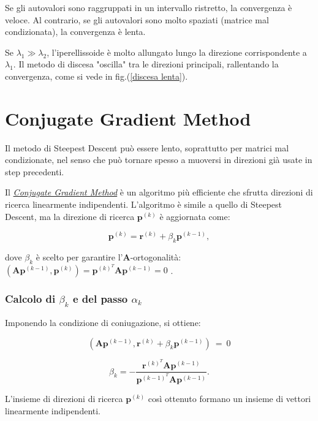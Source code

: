Se gli autovalori sono raggruppati in un intervallo ristretto, la convergenza è veloce. Al contrario, se gli autovalori sono molto spaziati (matrice mal condizionata), la convergenza è lenta.

Se $\lambda_1 \gg \lambda_2$, l'iperellissoide è molto allungato lungo la direzione corrispondente a $\lambda_1$.
Il metodo di discesa "oscilla" tra le direzioni principali, rallentando la convergenza, come si vede in fig.(\ref{discesa lenta}).


%
%
%
\section{Conjugate Gradient Method}

Il metodo di Steepest Descent può essere lento, soprattutto per matrici mal condizionate, nel senso che può tornare spesso a muoversi in direzioni già usate in step precedenti. 

Il \underline{\emph{Conjugate Gradient Method}} è un algoritmo più efficiente che sfrutta direzioni di ricerca linearmente indipendenti.
L'algoritmo è simile a quello di Steepest Descent, ma la direzione di ricerca $\mathbf{p}^{(k)}$ è aggiornata come:

\begin{equation*}
	\mathbf{p}^{(k)} = \mathbf{r}^{(k)} + \beta_k \mathbf{p}^{(k-1)},
\end{equation*}

dove $\beta_k$ è scelto per garantire l'$\mathbf{A}$-ortogonalità:
$(\mathbf A \mathbf p^{(k-1)}, \mathbf p^{(k)}) = \mathbf{p}^{(k)^T} \mathbf{A} \mathbf{p}^{(k-1)} = 0$ .


\subsubsection{Calcolo di $\beta_k$ e del passo $\alpha_k$}

Imponendo la condizione di coniugazione, si ottiene:

\[
(\mathbf A \mathbf p^{(k-1)}, \mathbf{r}^{(k)} + \beta_k \mathbf{p}^{(k-1)})\ =\ 0
\]

\begin{equation*}
	\beta_k = -\frac{\mathbf{r}^{(k)^T} \mathbf{A} \mathbf{p}^{(k-1)}}{\mathbf{p}^{(k-1)^T} \mathbf{A} \mathbf{p}^{(k-1)}}.
\end{equation*}

L'insieme di direzioni di ricerca $\mathbf p^{(k)}$ così ottenuto formano un insieme di vettori linearmente indipendenti.

